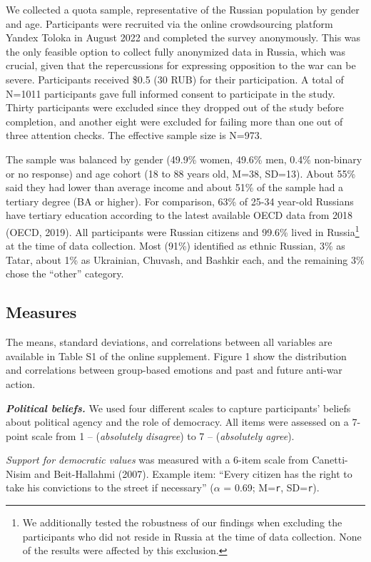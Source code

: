 \documentclass[
]{article}
\begin{document}
We collected a quota sample, representative of the Russian population by gender and age. Participants were recruited via the online crowdsourcing platform Yandex Toloka in August 2022 and completed the survey anonymously. This was the only feasible option to collect fully anonymized data in Russia, which was crucial, given that the repercussions for expressing opposition to the war can be severe. Participants received \$0.5 (30 RUB) for their participation. A total of N=1011 participants gave full informed consent to participate in the study. Thirty participants were excluded since they dropped out of the study before completion, and another eight were excluded for failing more than one out of three attention checks. The effective sample size is N=973.

The sample was balanced by gender (49.9\% women, 49.6\% men, 0.4\% non-binary or no response) and age cohort (18 to 88 years old, M=38, SD=13). About 55\% said they had lower than average income and about 51\% of the sample had a tertiary degree (BA or higher). For comparison, 63\% of 25-34 year-old Russians have tertiary education according to the latest available OECD data from 2018 (OECD, 2019). All participants were Russian citizens and 99.6\% lived in Russia\footnote{We additionally tested the robustness of our findings when excluding the participants who did not reside in Russia at the time of data collection. None of the results were affected by this exclusion.} at the time of data collection. Most (91\%) identified as ethnic Russian, 3\% as Tatar, about 1\% as Ukrainian, Chuvash, and Bashkir each, and the remaining 3\% chose the ``other'' category.

\subsection*{Measures}\label{measures}

The means, standard deviations, and correlations between all variables are available in Table S1 of the online supplement. Figure 1 show the distribution and correlations between group-based emotions and past and future anti-war action.

\textbf{\emph{Political beliefs.}} We used four different scales to capture participants' beliefs about political agency and the role of democracy. All items were assessed on a 7-point scale from 1 -- (\emph{absolutely disagree}) to 7 -- (\emph{absolutely agree}).

\emph{Support for democratic values} was measured with a 6-item scale from Canetti-Nisim and Beit-Hallahmi (2007). Example item: ``Every citizen has the right to take his convictions to the street if necessary'' (\(\alpha\) = 0.69; M=\texttt{r}, SD=\texttt{r}).
\end{document}
